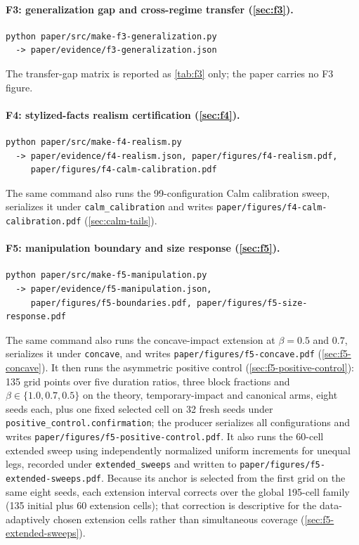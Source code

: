\paragraph{F3: generalization gap and cross-regime transfer (\cref{sec:f3}).}
\begin{verbatim}
python paper/src/make-f3-generalization.py
  -> paper/evidence/f3-generalization.json
\end{verbatim}
The transfer-gap matrix is reported as \cref{tab:f3} only; the paper carries no F3 figure.

\paragraph{F4: stylized-facts realism certification (\cref{sec:f4}).}
\begin{verbatim}
python paper/src/make-f4-realism.py
  -> paper/evidence/f4-realism.json, paper/figures/f4-realism.pdf,
     paper/figures/f4-calm-calibration.pdf
\end{verbatim}
The same command also runs the 99-configuration Calm calibration sweep, serializes it under \texttt{calm\_calibration} and writes \texttt{paper/figures/f4-calm-calibration.pdf} (\cref{sec:calm-tails}).

\paragraph{F5: manipulation boundary and size response (\cref{sec:f5}).}
\begin{verbatim}
python paper/src/make-f5-manipulation.py
  -> paper/evidence/f5-manipulation.json,
     paper/figures/f5-boundaries.pdf, paper/figures/f5-size-response.pdf
\end{verbatim}
The same command also runs the concave-impact extension at $\beta=0.5$ and $0.7$, serializes it under \texttt{concave}, and writes \texttt{paper/figures/f5-concave.pdf} (\cref{sec:f5-concave}). It then runs the asymmetric positive control (\cref{sec:f5-positive-control}): 135 grid points over five duration ratios, three block fractions and $\beta \in \{1.0, 0.7, 0.5\}$ on the theory, temporary-impact and canonical arms, eight seeds each, plus one fixed selected cell on 32 fresh seeds under \texttt{positive\_control.confirmation}; the producer serializes all configurations and writes \texttt{paper/figures/f5-positive-control.pdf}. It also runs the 60-cell extended sweep using independently normalized uniform increments for unequal legs, recorded under \texttt{extended\_sweeps} and written to \texttt{paper/figures/f5-extended-sweeps.pdf}. Because its anchor is selected from the first grid on the same eight seeds, each extension interval corrects over the global 195-cell family (135 initial plus 60 extension cells); that correction is descriptive for the data-adaptively chosen extension cells rather than simultaneous coverage (\cref{sec:f5-extended-sweeps}).

